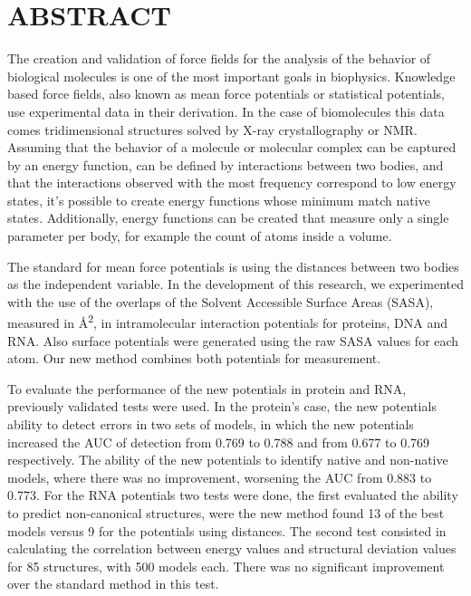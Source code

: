 \newpage
\section*{ABSTRACT}
\begin{singlespace}
\par
The creation and validation of force fields for the analysis of the behavior of biological molecules is one of the most important goals in biophysics.
Knowledge based force fields, also known as mean force potentials or statistical potentials, use experimental data in their derivation.
In the case of biomolecules this data comes tridimensional structures solved by X-ray crystallography or NMR.
Assuming that the behavior of a molecule or molecular complex can be captured by an energy function, can be defined by interactions between two bodies, and that the interactions observed with the most frequency correspond to low energy states, it's possible to create energy functions whose minimum match native states.
Additionally, energy functions can be created that measure only a single parameter per body, for example the count of atoms inside a volume.
\par
The standard for mean force potentials is using the distances between two bodies as the independent variable.
In the development of this research, we experimented with the use of the overlaps of the Solvent Accessible Surface Areas (SASA), measured in \si{\angstrom}\textsuperscript{2}, in intramolecular interaction potentials for proteins, DNA and RNA. Also surface potentials were generated using the raw SASA values for each atom. Our new method combines both potentials for measurement.
\par
To evaluate the performance of the new potentials in protein and RNA, previously validated tests were used.
In the protein's case, the new potentials ability to detect errors in two sets of models, in which the new potentials increased the AUC of detection from 0.769 to 0.788 and from 0.677 to 0.769 respectively.
The ability of the new potentials to identify native and non-native models, where there was no improvement, worsening the AUC from 0.883 to 0.773.
For the RNA potentials two tests were done, the first evaluated the ability to predict non-canonical structures, were the new method found 13 of the best models versus 9 for the potentials using distances. The second test consisted in calculating the correlation between energy values and structural deviation values for 85 structures, with 500 models each. There was no significant improvement over the standard method in this test.

\end{singlespace}
